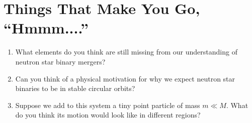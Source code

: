 \documentclass[11pt]{article}
\begin{document}
\section*{Things That Make You Go, ``Hmmm....''}

\begin{enumerate}

\item What elements do you think are still missing from our understanding of neutron star binary mergers?

\item Can you think of a physical motivation for why we expect neutron star binaries to be in stable circular orbits?

\item Suppose we add to this system a tiny point particle of mass $m \ll M$. What do you think its motion would look like in different regions?

\end{enumerate}
\end{document}
